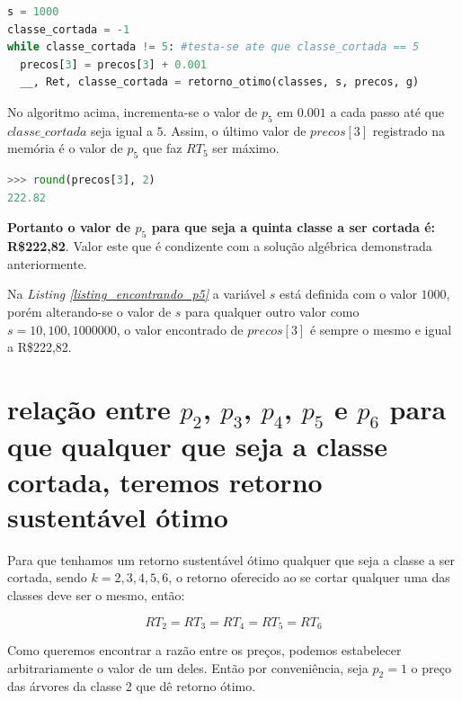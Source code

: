 \documentclass[a4paper, 12pt]{article}
\begin{document}
\begin{lstlisting}[language=Python, caption=Encontrando $p_5$ tal que $RT_5$ é máximo, label=listing_encontrando_p5]
s = 1000
classe_cortada = -1
while classe_cortada != 5: #testa-se ate que classe_cortada == 5
  precos[3] = precos[3] + 0.001 
  __, Ret, classe_cortada = retorno_otimo(classes, s, precos, g)
\end{lstlisting}

No algoritmo acima, incrementa-se o valor de $p_5$ em $0.001$ a cada passo até que $classe\_cortada$ seja igual a $5$. Assim, o último valor de $precos[3]$ registrado na memória é o valor de $p_5$ que faz $RT_5$ ser máximo. 


\begin{lstlisting}[language=Python, caption=Valor de $p_5$ tal que $classe\_cortada$ é 5, label=listing_valor_de_p5]
>>> round(precos[3], 2)
222.82
\end{lstlisting}

\textbf{Portanto o valor de $p_5$ para que seja a quinta classe a ser cortada é: R\$222,82}. Valor este que é condizente com a solução algébrica demonstrada anteriormente.\newline

Na \emph{Listing \ref{listing_encontrando_p5}} a variável $s$ está definida com o valor $1000$, porém alterando-se o valor de $s$ para qualquer outro valor como $s=10, 100, 1000000$, o valor encontrado de $precos[3]$ é sempre o mesmo e igual a R\$222,82.



\section{relação entre $p_2$, $p_3$, $p_4$, $p_5$ e $p_6$ para que qualquer que seja a classe cortada, teremos retorno sustentável ótimo}

Para que tenhamos um retorno sustentável ótimo qualquer que seja a classe a ser cortada, sendo $k=2,3,4,5,6$, o retorno oferecido ao se cortar qualquer uma das classes deve ser o mesmo, então:

\begin{equation}\label{RT2_RT3_RT4_RT5_RT6}
    RT_2=RT_3=RT_4=RT_5=RT_6
\end{equation}

Como queremos encontrar a razão entre os preços, podemos estabelecer arbitrariamente o valor de um deles. Então por conveniência, seja $p_2=1$ o preço das árvores da classe 2 que dê retorno ótimo.
\end{document}
